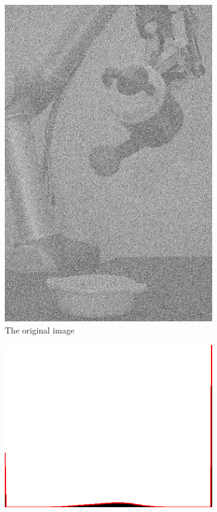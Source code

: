 \begin{figure}[H]
    \centering
    \begin{subfigure}[b]{0.16\textwidth}
        \includegraphics[width=\textwidth]{img2/src.png}
        \caption{The original image}
        \label{fig:img2_src}
    \end{subfigure}
    \begin{subfigure}[b]{0.16\textwidth}
        \includegraphics[width=\textwidth]{img2/hist.png}

\end{subfigure}
\end{figure}

